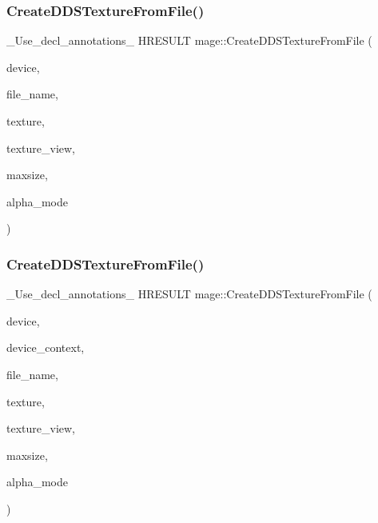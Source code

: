 \hypertarget{namespacemage_a3a3965b1c7679947007304baf7ba0cde}{}\label{namespacemage_a3a3965b1c7679947007304baf7ba0cde} 
\subsubsection{\texorpdfstring{Create\+D\+D\+S\+Texture\+From\+File()}{CreateDDSTextureFromFile()}\hspace{0.1cm}{\footnotesize\ttfamily [3/4]}}
{\footnotesize\ttfamily \+\_\+\+Use\+\_\+decl\+\_\+annotations\+\_\+ H\+R\+E\+S\+U\+LT mage\+::\+Create\+D\+D\+S\+Texture\+From\+File (\begin{DoxyParamCaption}\item[{I\+D3\+D11\+Device2 $\ast$}]{device,  }\item[{const wchar\+\_\+t $\ast$}]{file\+\_\+name,  }\item[{I\+D3\+D11\+Resource $\ast$$\ast$}]{texture,  }\item[{I\+D3\+D11\+Shader\+Resource\+View $\ast$$\ast$}]{texture\+\_\+view,  }\item[{size\+\_\+t}]{maxsize,  }\item[{\hyperlink{namespacemage_a0c586a2bad862f4858900ca121ca80c2}{D\+D\+S\+\_\+\+A\+L\+P\+H\+A\+\_\+\+M\+O\+DE} $\ast$}]{alpha\+\_\+mode }\end{DoxyParamCaption})}

\hypertarget{namespacemage_a6385bd66f00f588eb7735234edd95f1e}{}\label{namespacemage_a6385bd66f00f588eb7735234edd95f1e} 
\subsubsection{\texorpdfstring{Create\+D\+D\+S\+Texture\+From\+File()}{CreateDDSTextureFromFile()}\hspace{0.1cm}{\footnotesize\ttfamily [4/4]}}
{\footnotesize\ttfamily \+\_\+\+Use\+\_\+decl\+\_\+annotations\+\_\+ H\+R\+E\+S\+U\+LT mage\+::\+Create\+D\+D\+S\+Texture\+From\+File (\begin{DoxyParamCaption}\item[{I\+D3\+D11\+Device2 $\ast$}]{device,  }\item[{I\+D3\+D11\+Device\+Context $\ast$}]{device\+\_\+context,  }\item[{const wchar\+\_\+t $\ast$}]{file\+\_\+name,  }\item[{I\+D3\+D11\+Resource $\ast$$\ast$}]{texture,  }\item[{I\+D3\+D11\+Shader\+Resource\+View $\ast$$\ast$}]{texture\+\_\+view,  }\item[{size\+\_\+t}]{maxsize,  }\item[{\hyperlink{namespacemage_a0c586a2bad862f4858900ca121ca80c2}{D\+D\+S\+\_\+\+A\+L\+P\+H\+A\+\_\+\+M\+O\+DE} $\ast$}]{alpha\+\_\+mode }\end{DoxyParamCaption})}

